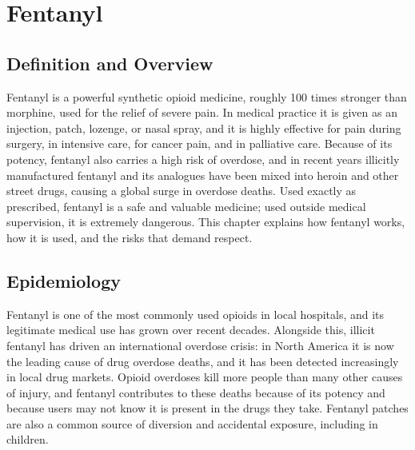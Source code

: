 \chapter{Fentanyl}

\section*{Definition and Overview}
Fentanyl is a powerful synthetic opioid medicine, roughly 100 times stronger than morphine, used for the relief of severe pain. In medical practice it is given as an injection, patch, lozenge, or nasal spray, and it is highly effective for pain during surgery, in intensive care, for cancer pain, and in palliative care. Because of its potency, fentanyl also carries a high risk of overdose, and in recent years illicitly manufactured fentanyl and its analogues have been mixed into heroin and other street drugs, causing a global surge in overdose deaths. Used exactly as prescribed, fentanyl is a safe and valuable medicine; used outside medical supervision, it is extremely dangerous. This chapter explains how fentanyl works, how it is used, and the risks that demand respect.

\section*{Epidemiology}
Fentanyl is one of the most commonly used opioids in local hospitals, and its legitimate medical use has grown over recent decades. Alongside this, illicit fentanyl has driven an international overdose crisis: in North America it is now the leading cause of drug overdose deaths, and it has been detected increasingly in local drug markets. Opioid overdoses kill more people than many other causes of injury, and fentanyl contributes to these deaths because of its potency and because users may not know it is present in the drugs they take. Fentanyl patches are also a common source of diversion and accidental exposure, including in children.


